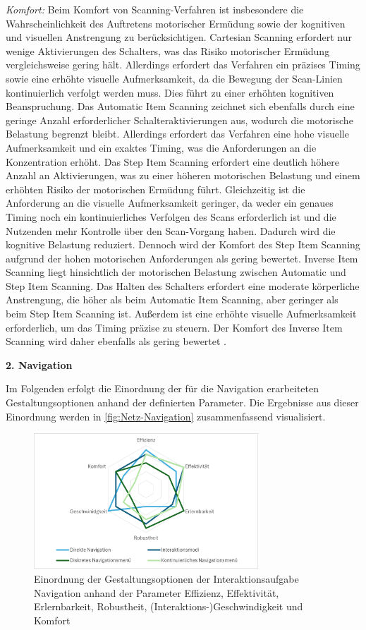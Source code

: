 \textit{Komfort:} 
Beim Komfort von Scanning-Verfahren ist insbesondere die Wahrscheinlichkeit des Auftretens motorischer Ermüdung sowie der kognitiven und visuellen Anstrengung zu berücksichtigen.
Cartesian Scanning erfordert nur wenige Aktivierungen des Schalters, was das Risiko motorischer Ermüdung vergleichsweise gering hält. Allerdings erfordert das Verfahren ein präzises Timing sowie eine erhöhte visuelle Aufmerksamkeit, da die Bewegung der Scan-Linien kontinuierlich verfolgt werden muss. Dies führt zu einer erhöhten kognitiven Beanspruchung. Das Automatic Item Scanning zeichnet sich ebenfalls durch eine geringe Anzahl erforderlicher Schalteraktivierungen aus, wodurch die motorische Belastung begrenzt bleibt. Allerdings erfordert das Verfahren eine hohe visuelle Aufmerksamkeit und ein exaktes Timing, was die Anforderungen an die Konzentration erhöht. Das Step Item Scanning erfordert eine deutlich höhere Anzahl an Aktivierungen, was zu einer höheren motorischen Belastung und einem erhöhten Risiko der motorischen Ermüdung führt. Gleichzeitig ist die Anforderung an die visuelle Aufmerksamkeit geringer, da weder ein genaues Timing noch ein kontinuierliches Verfolgen des Scans erforderlich ist und die Nutzenden mehr Kontrolle über den Scan-Vorgang haben. Dadurch wird die kognitive Belastung reduziert. Dennoch wird der Komfort des Step Item Scanning aufgrund der hohen motorischen Anforderungen als gering bewertet. Inverse Item Scanning liegt hinsichtlich der motorischen Belastung zwischen Automatic und Step Item Scanning. Das Halten des Schalters erfordert eine moderate körperliche Anstrengung, die höher als beim Automatic Item Scanning, aber geringer als beim Step Item Scanning ist. Außerdem ist eine erhöhte visuelle Aufmerksamkeit erforderlich, um das Timing präzise zu steuern. Der Komfort des Inverse Item Scanning wird daher ebenfalls als gering bewertet \citep{COOK2015117}.

\textbf{2. Navigation} 

Im Folgenden erfolgt die Einordnung der für die Navigation erarbeiteten Gestaltungsoptionen anhand der definierten Parameter. Die Ergebnisse aus dieser Einordnung werden in \autoref{fig:Netz-Navigation} zusammenfassend visualisiert. 

\begin{figure}[tbh]
    \centering
    \includegraphics[width=0.75\textwidth]{images/Netzdiagramm-Navigation.png}
    \caption{Einordnung der Gestaltungsoptionen der Interaktionsaufgabe Navigation anhand der Parameter Effizienz, Effektivität, Erlernbarkeit, Robustheit, (Interaktions-)Geschwindigkeit und Komfort}
    \label{fig:Netz-Navigation}
\end{figure}

